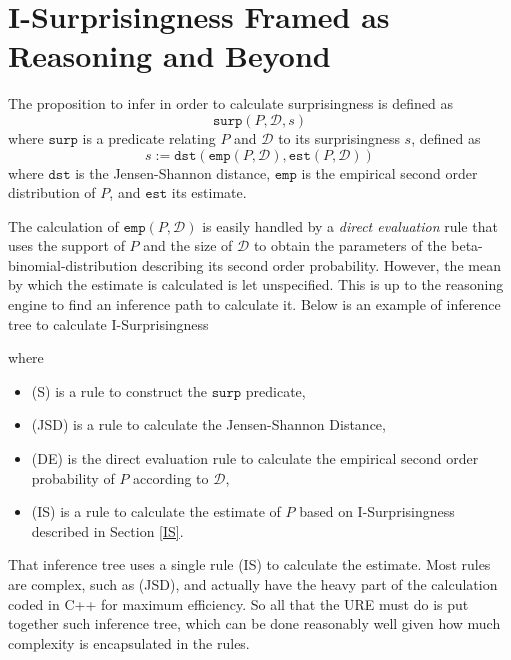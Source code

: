 \documentclass[runningheads]{llncs}
\begin{document}
\section{I-Surprisingness Framed as Reasoning and Beyond}
\label{ISRB}

The proposition to infer in order to calculate surprisingness is
defined as
$$
\texttt{surp}(P, \mathcal{D}, s)
$$
where $\texttt{surp}$ is a predicate relating $P$ and $\mathcal{D}$ to
its surprisingness $s$, defined as
$$
s := \texttt{dst}(\texttt{emp}(P,\mathcal{D}),\texttt{est}(P,\mathcal{D}))
$$ where $\texttt{dst}$ is the Jensen-Shannon distance, $\texttt{emp}$
is the empirical second order distribution of $P$, and $\texttt{est}$
its estimate.

The calculation of $\texttt{emp}(P, \mathcal{D})$ is easily handled by
a \emph{direct evaluation} rule that uses the support of $P$ and the
size of $\mathcal{D}$ to obtain the parameters of the
beta-binomial-distribution describing its second order probability.
However, the mean by which the estimate is calculated is let
unspecified. This is up to the reasoning engine to find an inference
path to calculate it. Below is an example of inference tree to
calculate I-Surprisingness
\begin{prooftree}




\end{prooftree}
where
\begin{itemize}
\item (S) is a rule to construct the $\texttt{surp}$ predicate,
\item (JSD) is a rule to calculate the Jensen-Shannon Distance,
\item (DE) is the direct evaluation rule to calculate the empirical
  second order probability of $P$ according to $\mathcal{D}$,
\item (IS) is a rule to calculate the estimate of $P$ based on
  I-Surprisingness described in Section \ref{IS}.
\end{itemize}
That inference tree uses a single rule (IS) to calculate the
estimate. Most rules are complex, such as (JSD), and actually have the
heavy part of the calculation coded in C++ for maximum efficiency. So
all that the URE must do is put together such inference tree, which
can be done reasonably well given how much complexity is encapsulated
in the rules.
\end{document}
